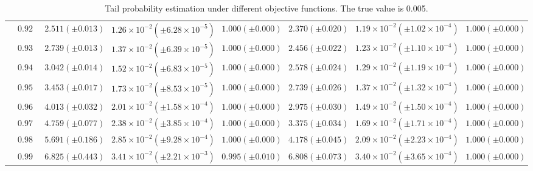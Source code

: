 \begin{table}[ht]
{\begin{tabular}{cc|ccc|ccc}
&$0.920$ & $2.511(\pm0.013)$ & $1.26\times 10^{-2}(\pm6.28\times 10^{-5})$ & $1.000(\pm0.000)$ & $2.370(\pm0.020)$ & $1.19\times 10^{-2}(\pm1.02\times 10^{-4})$ & $1.000(\pm0.000)$\\
&$0.930$ & $2.739(\pm0.013)$ & $1.37\times 10^{-2}(\pm6.39\times 10^{-5})$ & $1.000(\pm0.000)$ & $2.456(\pm0.022)$ & $1.23\times 10^{-2}(\pm1.10\times 10^{-4})$ & $1.000(\pm0.000)$\\
&$0.940$ & $3.042(\pm0.014)$ & $1.52\times 10^{-2}(\pm6.83\times 10^{-5})$ & $1.000(\pm0.000)$ & $2.578(\pm0.024)$ & $1.29\times 10^{-2}(\pm1.19\times 10^{-4})$ & $1.000(\pm0.000)$\\
&$0.950$ & $3.453(\pm0.017)$ & $1.73\times 10^{-2}(\pm8.53\times 10^{-5})$ & $1.000(\pm0.000)$ & $2.739(\pm0.026)$ & $1.37\times 10^{-2}(\pm1.32\times 10^{-4})$ & $1.000(\pm0.000)$\\
&$0.960$ & $4.013(\pm0.032)$ & $2.01\times 10^{-2}(\pm1.58\times 10^{-4})$ & $1.000(\pm0.000)$ & $2.975(\pm0.030)$ & $1.49\times 10^{-2}(\pm1.50\times 10^{-4})$ & $1.000(\pm0.000)$\\
&$0.970$ & $4.759(\pm0.077)$ & $2.38\times 10^{-2}(\pm3.85\times 10^{-4})$ & $1.000(\pm0.000)$ & $3.375(\pm0.034)$ & $1.69\times 10^{-2}(\pm1.71\times 10^{-4})$ & $1.000(\pm0.000)$\\
&$0.980$ & $5.691(\pm0.186)$ & $2.85\times 10^{-2}(\pm9.28\times 10^{-4})$ & $1.000(\pm0.000)$ & $4.178(\pm0.045)$ & $2.09\times 10^{-2}(\pm2.23\times 10^{-4})$ & $1.000(\pm0.000)$\\
&$0.990$ & $6.825(\pm0.443)$ & $3.41\times 10^{-2}(\pm2.21\times 10^{-3})$ & $0.995(\pm0.010)$ & $6.808(\pm0.073)$ & $3.40\times 10^{-2}(\pm3.65\times 10^{-4})$ & $1.000(\pm0.000)$\\
    \hline
    \bottomrule
    \end{tabular}}\caption{Tail probability estimation under different objective functions. The true value is 0.005.}
    \label{tb4_tpe_0.7}
\end{table}